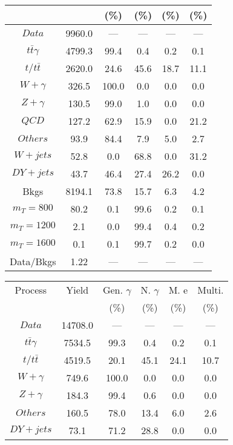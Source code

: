 \begin{figure}
\begin{minipage}[c]{0.32\textwidth}
{\begin{tabular}{cccccc}
 &  & (\%) & (\%) & (\%) & (\%)  \\
\hline
                                                                      $ Data $ &  9960.0 &  --- &  --- &  --- &  ---\\
$ t\bar{t}\gamma $ &  4799.3 &  99.4 &  0.4 &  0.2 &  0.1\\
$ t/t\bar{t} $ &  2620.0 &  24.6 &  45.6 &  18.7 &  11.1\\
$ W+\gamma $ &  326.5 &  100.0 &  0.0 &  0.0 &  0.0\\
$ Z+\gamma $ &  130.5 &  99.0 &  1.0 &  0.0 &  0.0\\
$ QCD $ &  127.2 &  62.9 &  15.9 &  0.0 &  21.2\\
$ Others $ &  93.9 &  84.4 &  7.9 &  5.0 &  2.7\\
$ W+jets $ &  52.8 &  0.0 &  68.8 &  0.0 &  31.2\\
$ DY+jets $ &  43.7 &  46.4 &  27.4 &  26.2 &  0.0\\
Bkgs &  8194.1 &  73.8 &  15.7 &  6.3 &  4.2\\
$ m_{T} = 800 $ &  80.2 &  0.1 &  99.6 &  0.2 &  0.1\\
$ m_{T} = 1200 $ &  2.1 &  0.0 &  99.4 &  0.4 &  0.2\\
$ m_{T} = 1600 $ &  0.1 &  0.1 &  99.7 &  0.2 &  0.0\\
Data/Bkgs &  1.22 &  --- &  --- &  --- &  ---\\
\hline
\end{tabular}
}
\end{minipage}
\begin{minipage}[c]{0.32\textwidth}
\centering
\tiny{
\begin{tabular}{cccccc}
\hline
Process & Yield & Gen. $\gamma$ & N. $\gamma$ & M. e & Multi. \\
 &  & (\%) & (\%) & (\%) & (\%)  \\
\hline
                                                                      $ Data $ &  14708.0 &  --- &  --- &  --- &  ---\\
$ t\bar{t}\gamma $ &  7534.5 &  99.3 &  0.4 &  0.2 &  0.1\\
$ t/t\bar{t} $ &  4519.5 &  20.1 &  45.1 &  24.1 &  10.7\\
$ W+\gamma $ &  749.6 &  100.0 &  0.0 &  0.0 &  0.0\\
$ Z+\gamma $ &  184.3 &  99.4 &  0.6 &  0.0 &  0.0\\
$ Others $ &  160.5 &  78.0 &  13.4 &  6.0 &  2.6\\
$ DY+jets $ &  73.1 &  71.2 &  28.8 &  0.0 &  0.0\\

\end{tabular}}
\end{minipage}
\end{figure}
